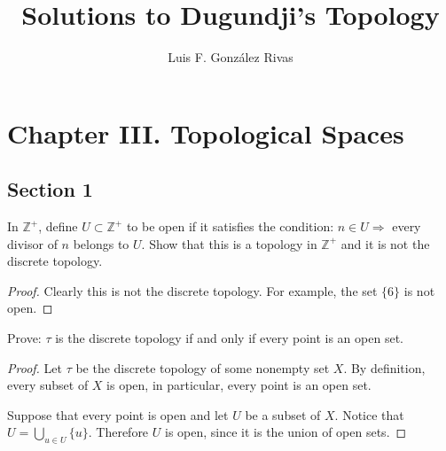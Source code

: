 \documentclass[12pt]{article}
\author{Luis F. Gonz\'alez Rivas}
\title{Solutions to Dugundji's Topology}
\newcommand{\Z}{\mathbb{Z}}
\begin{document}
\maketitle

\section*{Chapter III. Topological Spaces}

\subsection*{Section 1}

\newenvironment{problem}[2][Problem]{\begin{trivlist}
\item[\hskip \labelsep {\bfseries #1}\hskip \labelsep {\bfseries #2.}]}{\end{trivlist}}

\begin{problem}{5} In $\Z^+$, define $U \subset \Z^+$ to be open if it satisfies the condition: $n \in U \Rightarrow $ every divisor of $n$ belongs to $U$. Show that this is a topology in $\Z^+$ and it is not the discrete topology.  
\end{problem}

\begin{proof}

Clearly this is not the discrete topology. For example, the set $\{6\}$ is not open.
\end{proof}

\begin{problem}{6} Prove: $\tau$ is the discrete topology if and only if every point is an open set.
\end{problem}
\begin{proof}
Let $\tau$ be the discrete topology of some nonempty set $X$. By definition, every subset of $X$ is open, in particular, every point is an open set. 

Suppose that every point is open and let $U$ be a subset of $X.$  Notice that $U = \bigcup_{u \in U} \{u\}$. Therefore $U$ is open, since it is the union of open sets.
\end{proof}
\end{document}
